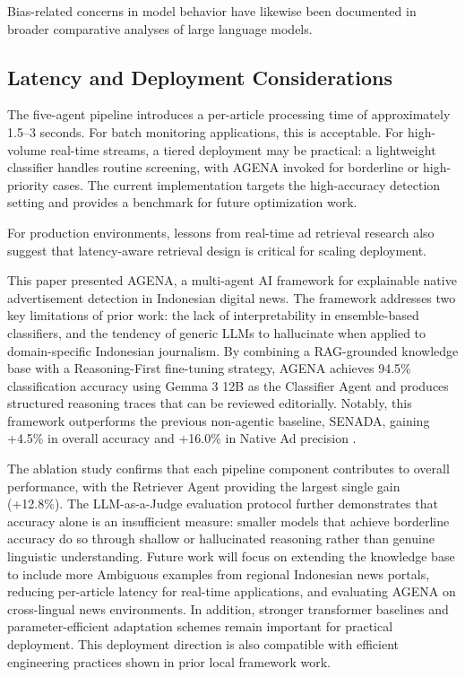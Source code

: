 \documentclass{ieeeaccess}
\begin{document}
Bias-related concerns in model behavior have likewise been documented in broader comparative analyses of large language models.

\subsection{Latency and Deployment Considerations}
The five-agent pipeline introduces a per-article processing time of approximately 1.5--3 seconds. For batch monitoring applications, this is acceptable. For high-volume real-time streams, a tiered deployment may be practical: a lightweight classifier handles routine screening, with AGENA invoked for borderline or high-priority cases. The current implementation targets the high-accuracy detection setting and provides a benchmark for future optimization work.

For production environments, lessons from real-time ad retrieval research also suggest that latency-aware retrieval design is critical for scaling deployment.

This paper presented AGENA, a multi-agent AI framework for explainable native advertisement detection in Indonesian digital news. The framework addresses two key limitations of prior work: the lack of interpretability in ensemble-based classifiers, and the tendency of generic LLMs to hallucinate when applied to domain-specific Indonesian journalism. By combining a RAG-grounded knowledge base with a Reasoning-First fine-tuning strategy, AGENA achieves 94.5\% classification accuracy using Gemma 3 12B as the Classifier Agent and produces structured reasoning traces that can be reviewed editorially. Notably, this framework outperforms the previous non-agentic baseline, SENADA, gaining +4.5\% in overall accuracy and +16.0\% in Native Ad precision \cite{b19}.

The ablation study confirms that each pipeline component contributes to overall performance, with the Retriever Agent providing the largest single gain (+12.8\%). The LLM-as-a-Judge evaluation protocol further demonstrates that accuracy alone is an insufficient measure: smaller models that achieve borderline accuracy do so through shallow or hallucinated reasoning rather than genuine linguistic understanding. Future work will focus on extending the knowledge base to include more Ambiguous examples from regional Indonesian news portals, reducing per-article latency for real-time applications, and evaluating AGENA on cross-lingual news environments. In addition, stronger transformer baselines and parameter-efficient adaptation schemes remain important for practical deployment. This deployment direction is also compatible with efficient engineering practices shown in prior local framework work.
\end{document}
